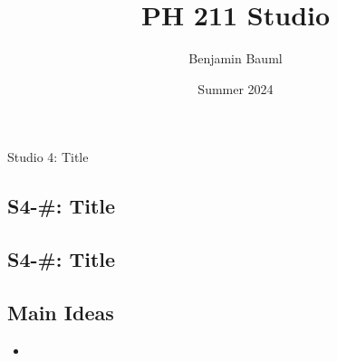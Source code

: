 \documentclass[]{article}
\title{PH 211 Studio \Week}
\author{Benjamin Bauml}
\date{Summer 2024}
\begin{document}
\begin{TeacherMargin}

\end{TeacherMargin}
\begin{PresentSpace}
\begin{center}
	\huge Studio 4: Title \\
	\vspace{1cm}
\end{center}
\begin{comment}{2}
\begin{enumerate}[(A)]
	\item Velocity is acceleration times $t$.
	\vspace{6pt}
	\item Acceleration is velocity times $t$.
	\vspace{15pt}
	\item Acceleration is the derivative of velocity.
	\item Velocity is the derivative of acceleration.
\end{enumerate}
\end{comment}
\end{PresentSpace}
\newpage
\begin{TeacherMargin}

\end{TeacherMargin}
\begin{PresentSpace}
\vspace{-10pt}
\section*{S4-#: Title}
\vspace{-10pt}

\end{PresentSpace}
\newpage
\begin{TeacherMargin}

\end{TeacherMargin}
\begin{PresentSpace}
\vspace{-10pt}
\section*{S4-#: Title}
\vspace{-10pt}

\end{PresentSpace}
\newpage
\begin{TeacherMargin}

\end{TeacherMargin}
\begin{PresentSpace}
\section*{Main Ideas}
\begin{itemize}
	\item 
\end{itemize}
\end{PresentSpace}
\end{document}

